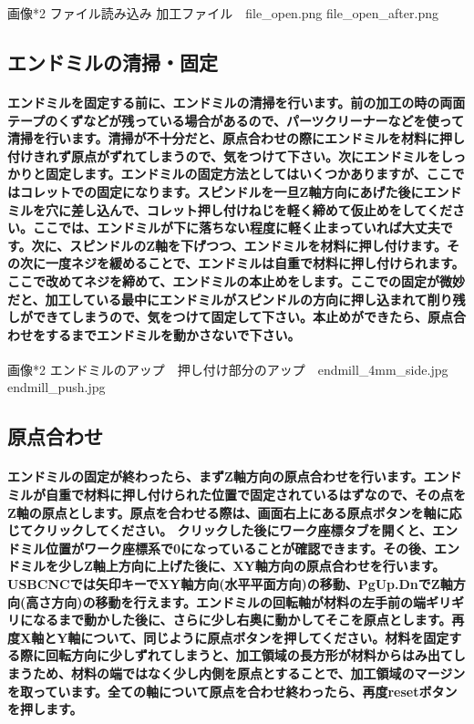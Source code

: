 \documentclass[b5paper, 9pt, twocolumn, titlepage,openany]{jsbook}%
\begin{document}
画像*2 ファイル読み込み 加工ファイル　file_open.png file_open_after.png

\subsection{エンドミルの清掃・固定}
\paragraph{エンドミルを固定する前に、エンドミルの清掃を行います。前の加工の時の両面テープのくずなどが残っている場合があるので、パーツクリーナーなどを使って清掃を行います。清掃が不十分だと、原点合わせの際にエンドミルを材料に押し付けきれず原点がずれてしまうので、気をつけて下さい。次にエンドミルをしっかりと固定します。エンドミルの固定方法としてはいくつかありますが、ここではコレットでの固定になります。スピンドルを一旦Z軸方向にあげた後にエンドミルを穴に差し込んで、コレット押し付けねじを軽く締めて仮止めをしてください。ここでは、エンドミルが下に落ちない程度に軽く止まっていれば大丈夫です。次に、スピンドルのZ軸を下げつつ、エンドミルを材料に押し付けます。その次に一度ネジを緩めることで、エンドミルは自重で材料に押し付けられます。ここで改めてネジを締めて、エンドミルの本止めをします。ここでの固定が微妙だと、加工している最中にエンドミルがスピンドルの方向に押し込まれて削り残しができてしまうので、気をつけて固定して下さい。本止めができたら、原点合わせをするまでエンドミルを動かさないで下さい。}

画像*2 エンドミルのアップ　押し付け部分のアップ　endmill_4mm_side.jpg endmill_push.jpg

\subsection{原点合わせ}
\paragraph{エンドミルの固定が終わったら、まずZ軸方向の原点合わせを行います。エンドミルが自重で材料に押し付けられた位置で固定されているはずなので、その点をZ軸の原点とします。原点を合わせる際は、画面右上にある原点ボタンを軸に応じてクリックしてください。 クリックした後にワーク座標タブを開くと、エンドミル位置がワーク座標系で0になっていることが確認できます。その後、エンドミルを少しZ軸上方向に上げた後に、XY軸方向の原点合わせを行います。USBCNCでは矢印キーでXY軸方向(水平平面方向)の移動、PgUp.DnでZ軸方向(高さ方向)の移動を行えます。エンドミルの回転軸が材料の左手前の端ギリギリになるまで動かした後に、さらに少し右奥に動かしてそこを原点とします。再度X軸とY軸について、同じように原点ボタンを押してください。材料を固定する際に回転方向に少しずれてしまうと、加工領域の長方形が材料からはみ出てしまうため、材料の端ではなく少し内側を原点とすることで、加工領域のマージンを取っています。全ての軸について原点を合わせ終わったら、再度resetボタンを押します。}
\end{document}
